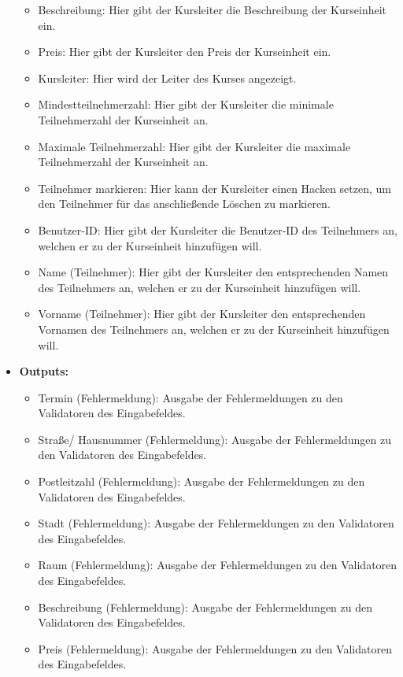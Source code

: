 \begin{itemize}
\begin{itemize}
								\item Beschreibung: Hier gibt der Kursleiter die Beschreibung der Kurseinheit ein.
								\item Preis: Hier gibt der Kursleiter den Preis der Kurseinheit ein.
								\item Kursleiter: Hier wird der Leiter des Kurses angezeigt.
								\item Mindestteilnehmerzahl: Hier gibt der Kursleiter die minimale Teilnehmerzahl der Kurseinheit an.
								\item Maximale Teilnehmerzahl: Hier gibt der Kursleiter die maximale Teilnehmerzahl der Kurseinheit an.
								\item Teilnehmer markieren: Hier kann der Kursleiter einen Hacken setzen, um den Teilnehmer für das anschließende Löschen zu markieren.
								\item Benutzer-ID: Hier gibt der Kursleiter die Benutzer-ID des Teilnehmers an, welchen er zu der Kurseinheit hinzufügen will.
								\item Name (Teilnehmer): Hier gibt der Kursleiter den entsprechenden Namen des Teilnehmers an, welchen er zu der Kurseinheit hinzufügen will.
								\item Vorname (Teilnehmer): Hier gibt der Kursleiter den entsprechenden Vornamen des Teilnehmers an, welchen er zu der Kurseinheit hinzufügen will.
							\end{itemize}
						\item \textbf{Outputs:}
							\begin{itemize}
								\item Termin (Fehlermeldung): Ausgabe der Fehlermeldungen zu den Validatoren des Eingabefeldes.
								\item Straße/ Hausnummer (Fehlermeldung): Ausgabe der Fehlermeldungen zu den Validatoren des Eingabefeldes.
								\item Postleitzahl (Fehlermeldung): Ausgabe der Fehlermeldungen zu den Validatoren des Eingabefeldes.
								\item Stadt (Fehlermeldung): Ausgabe der Fehlermeldungen zu den Validatoren des Eingabefeldes.
								\item Raum (Fehlermeldung): Ausgabe der Fehlermeldungen zu den Validatoren des Eingabefeldes.
								\item Beschreibung (Fehlermeldung): Ausgabe der Fehlermeldungen zu den Validatoren des Eingabefeldes.
								\item Preis (Fehlermeldung): Ausgabe der Fehlermeldungen zu den Validatoren des Eingabefeldes.

\end{itemize}
\end{itemize}
